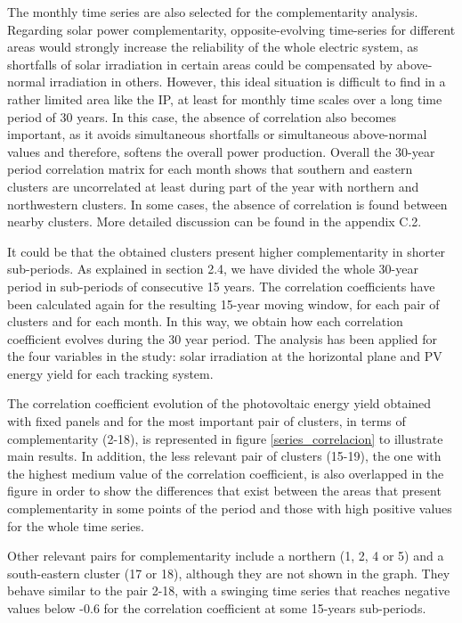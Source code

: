 The monthly time series are also selected for the complementarity analysis.
Regarding solar power complementarity, opposite-evolving time-series for different areas would strongly increase the reliability of the whole electric system, as shortfalls of solar irradiation in certain areas could be compensated by above-normal irradiation in others. However, this ideal situation is difficult to find in a rather limited area like the IP, at least for monthly time scales over a long time period of 30 years. In this case, the absence of correlation also becomes important, as it avoids simultaneous shortfalls or simultaneous above-normal values and therefore, softens the overall power production. Overall the 30-year period correlation matrix for each month shows that southern and eastern clusters are uncorrelated at least during part of the year with northern and northwestern clusters. In some cases, the absence of correlation is found between nearby clusters. More detailed discussion can be found in the appendix C.2.

It could be that the obtained clusters present higher complementarity in shorter sub-periods. As explained in section 2.4, we have divided the whole 30-year period in sub-periods of consecutive 15 years. The correlation coefficients have been calculated again for the resulting 15-year moving window, for each pair of clusters and for each month. In this way, we obtain how each correlation coefficient evolves during the 30 year period. The analysis has been applied for the four variables in the study: solar irradiation at the horizontal plane and PV energy yield for each tracking system.

The correlation coefficient evolution of the photovoltaic energy yield obtained with fixed panels and for the most important pair of clusters, in terms of complementarity (2-18), is represented in figure \ref{series_correlacion} to illustrate main results. In addition, the less relevant pair of clusters (15-19), the one with the highest medium value of the correlation coefficient, is also overlapped in the figure in order to show the differences that exist between the areas that present complementarity in some points of the period and those with high positive values for the whole time series.

Other relevant pairs for complementarity include a northern (1, 2, 4 or 5) and a south-eastern cluster (17 or 18),  although they are not shown in the graph. They behave similar to the pair 2-18, with a swinging time series that reaches negative values below -0.6 for the correlation coefficient at some 15-years sub-periods. 

